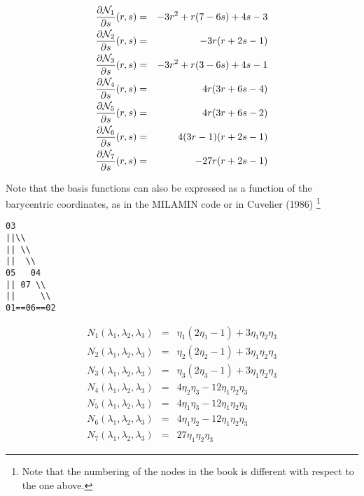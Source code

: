 \begin{eqnarray}
\frac{\partial {\mathcal{N}}_1}{\partial s}(r,s) &=& -3r^2+r(7-6s)+4s-3\\
\frac{\partial {\mathcal{N}}_2}{\partial s}(r,s) &=& -3r(r+2s-1)\\
\frac{\partial {\mathcal{N}}_3}{\partial s}(r,s) &=& -3r^2+r(3-6s)+4s-1 \\
\frac{\partial {\mathcal{N}}_4}{\partial s}(r,s) &=& 4r(3r+6s-4)  \\
\frac{\partial {\mathcal{N}}_5}{\partial s}(r,s) &=& 4r(3r+6s-2) \\
\frac{\partial {\mathcal{N}}_6}{\partial s}(r,s) &=& 4(3r-1)(r+2s-1)\\
\frac{\partial {\mathcal{N}}_7}{\partial s}(r,s) &=& -27r(r+2s-1)
\end{eqnarray}


Note that the basis functions can also be expressed as a function of the barycentric coordinates, 
as in the MILAMIN code \cite{daks08} or in Cuvelier \etal (1986) \cite{cuss86}\footnote{Note
that the numbering of the nodes in the book is different with respect to the one above. }

\begin{verbatim}
03          
||\\        
|| \\       
||  \\      
05   04     
|| 07 \\    
||     \\   
01==06==02    
\end{verbatim}

\begin{eqnarray}
N_1(\lambda_1,\lambda_2,\lambda_3) &=& \eta_1(2\eta_1-1)+ 3\eta_1\eta_2\eta_3\\
N_2(\lambda_1,\lambda_2,\lambda_3) &=& \eta_2(2\eta_2-1)+ 3\eta_1\eta_2\eta_3\\
N_3(\lambda_1,\lambda_2,\lambda_3) &=& \eta_3(2\eta_3-1)+ 3\eta_1\eta_2\eta_3\\
N_4(\lambda_1,\lambda_2,\lambda_3) &=& 4\eta_2\eta_3 - 12\eta_1\eta_2\eta_3\\
N_5(\lambda_1,\lambda_2,\lambda_3) &=& 4\eta_1\eta_3 - 12\eta_1\eta_2\eta_3\\
N_6(\lambda_1,\lambda_2,\lambda_3) &=& 4\eta_1\eta_2 - 12\eta_1\eta_2\eta_3\\
N_7(\lambda_1,\lambda_2,\lambda_3) &=& 27\eta_1\eta_2\eta_3 
\end{eqnarray}






